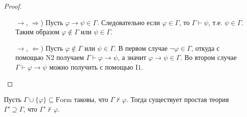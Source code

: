 \documentclass[12pt,a4paper]{article}
\newcommand{\Formul}{\ensuremath{\mathrm{Form}}\xspace}
\begin{document}
\begin{proof}
\begin{itemize}
            \item[$\rightarrow$, $\Rightarrow$)] Пусть $\varphi \rightarrow \psi \in \Gamma$. Следовательно если $\varphi \in \Gamma$, то $\Gamma \vdash \psi$, т.е. $\psi \in \Gamma$. Таким образом $\varphi \notin \Gamma$ или $\psi \in \Gamma$.

            \item[$\rightarrow$, $\Leftarrow$)] Пусть $\varphi \notin \Gamma$ или $\psi \in \Gamma$. В первом случае $\neg \varphi \in \Gamma$, откуда с помощью $\mathrm{N2}$ получаем $\Gamma \vdash \varphi \rightarrow \psi$, а значит $\varphi \rightarrow \psi \in \Gamma$. Во втором случае $\Gamma \vdash \varphi \rightarrow \psi$ можно получить с помощью $\mathrm{I1}$.
        \end{itemize}
    \end{proof}

    \begin{lemma}
        Пусть $\Gamma \cup \{\varphi\} \subseteq \Formul$ таковы, что $\Gamma \nvdash \varphi$. Тогда существует простая теория $\Gamma' \supseteq \Gamma$, что $\Gamma' \nvdash \varphi$.
    \end{lemma}
\end{document}
